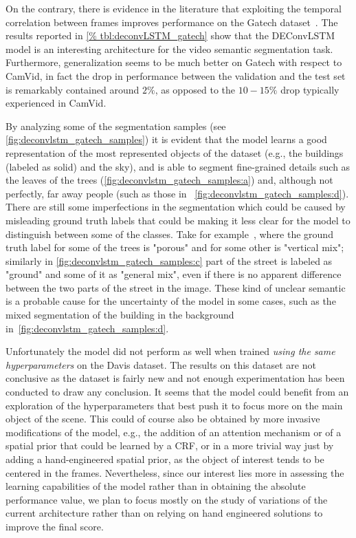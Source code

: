 On the contrary, there is evidence in the literature that exploiting the
temporal correlation between frames improves performance on the Gatech
dataset~\citep{Tran16v2v}. The results reported in \autoref{%
tbl:deconvLSTM_gatech} show that the DEConvLSTM model is an interesting
architecture for the video semantic segmentation task. Furthermore,
generalization seems to be much better on Gatech with respect to CamVid, in
fact the drop in performance between the validation and the test set is
remarkably contained around $2\%$, as opposed to the $10-15\%$ drop typically
experienced in CamVid.

By analyzing some of the segmentation samples (see
\autoref{fig:deconvlstm_gatech_samples}) it is evident that the model learns a
good representation of the most represented objects of the dataset (e.g., the
buildings (labeled as solid) and the sky), and is able to segment fine-grained
details such as the leaves of the trees
(\autoref{fig:deconvlstm_gatech_samples:a}) and, although not perfectly, far
away people (such as those in ~\autoref{fig:deconvlstm_gatech_samples:d}).
There are still some imperfections in the segmentation which could be caused by
misleading ground truth labels that could be making it less clear for the model
to distinguish between some of the classes. Take for
example~, where the ground truth label for some of the
trees is "porous" and for some other is "vertical mix"; similarly in
\autoref{fig:deconvlstm_gatech_samples:c} part of the street is labeled as
"ground" and some of it as "general mix", even if there is no apparent
difference between the two parts of the street in the image. These kind of
unclear semantic is a probable cause for the uncertainty of the model in some
cases, such as the mixed segmentation of the building in the background
in~\autoref{fig:deconvlstm_gatech_samples:d}.

Unfortunately the model did not perform as well when trained \emph{using the
same hyperparameters} on the Davis dataset. The results on this dataset are not
conclusive as the dataset is fairly new and not enough experimentation has been
conducted to draw any conclusion. It seems that the model could benefit from an
exploration of the hyperparameters that best push it to focus more on the main
object of the scene. This could of course also be obtained by more invasive
modifications of the model, e.g., the addition of an attention mechanism or of
a spatial prior that could be learned by a CRF, or in a more trivial way just
by adding a hand-engineered spatial prior, as the object of interest tends to
be centered in the frames. Nevertheless, since our interest lies more in
assessing the learning capabilities of the model rather than in obtaining the
absolute performance value, we plan to focus mostly on the study of variations
of the current architecture rather than on relying on hand engineered solutions
to improve the final score.

